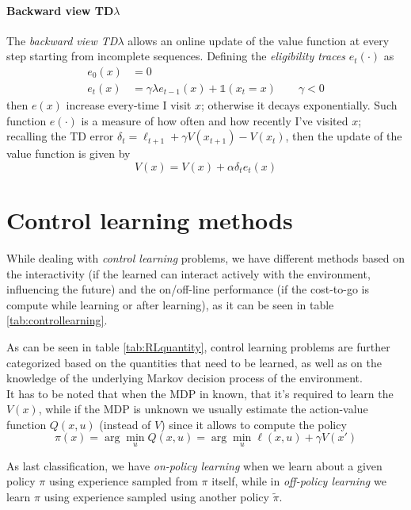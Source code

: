	\paragraph{Backward view TD$\lambda$} The \textit{backward view TD$\lambda$} allows an online update of the value function at every step starting  from incomplete sequences. Defining the \textit{eligibility traces} $e_t(\cdot)$ as
	\begin{equation}
	\begin{aligned}
		e_0(x) & = 0 \\ 
		e_t(x) & = \gamma \lambda e_{t-1}(x) + \mathbb 1(x_t = x) \qquad \gamma < 0
	\end{aligned}
	\end{equation}
	then $e(x)$ increase every-time I visit $x$; otherwise it decays exponentially. Such function $e(\cdot)$ is a measure of how often and how recently I've visited $x$; recalling the TD error $\delta_t = \ell_{t+1} + \gamma V(x_{t+1}) - V(x_t)$, then the update of the value function is given by
	\begin{equation}
		V(x) = V(x) + \alpha \delta_t e_t(x)
	\end{equation}

\section{Control learning methods}
	While dealing with \textit{control learning} problems, we have different methods based on the interactivity (if the learned can interact actively with the environment, influencing the future) and the on/off-line performance (if the cost-to-go is compute while learning or after learning), as it can be seen in table \ref{tab:controllearning}.
	
	
	As can be seen in table \ref{tab:RLquantity}, control learning problems are further categorized based on the quantities that need to be learned, as well as on the knowledge of the underlying Markov decision process of the environment.\\
	It has to be noted that when the MDP in known, that it's required to learn the $V(x)$, while if the MDP is unknown we usually estimate the action-value function $Q(x,u)$ (instead of $V$) since it allows to compute the policy
	\[ \pi(x) = \arg\min_u Q(x,u) = \arg \min_u \ell(x,u) + \gamma V(x') \]
	
	
	As last classification, we have \textit{on-policy learning} when we learn about a given policy $\pi$ using experience sampled from $\pi$ itself, while in \textit{off-policy learning} we learn $\pi$ using experience sampled using another policy $\tilde \pi$.
	
